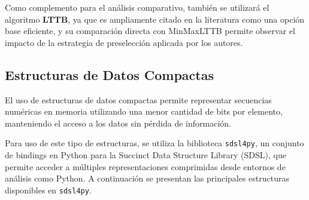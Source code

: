Como complemento para el análisis comparativo, también se utilizará el algoritmo \textbf{LTTB}, ya que es ampliamente citado en la literatura como una opción base eficiente, y su comparación directa con MinMaxLTTB permite observar el impacto de la estrategia de preselección aplicada por los autores.

\subsection{Estructuras de Datos Compactas}

El uso de estructuras de datos compactas permite representar secuencias numéricas en memoria utilizando una menor cantidad de bits por elemento, manteniendo el acceso a los datos sin pérdida de información. 

Para uso de este tipo de estructuras, se utiliza la biblioteca \texttt{sdsl4py}, un conjunto de bindings en Python para la Succinct Data Structure Library (SDSL), que permite acceder a múltiples representaciones comprimidas desde entornos de análisis como Python. A continuación se presentan las principales estructuras disponibles en \texttt{sdsl4py}.

